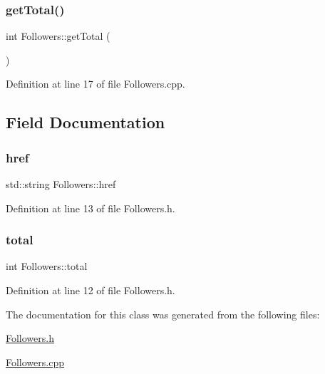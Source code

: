 \mbox{\label{class_followers_a2314b173d6733b64e4c92d19602bc0ff}} 
\subsubsection{\texorpdfstring{get\+Total()}{getTotal()}}
{\footnotesize\ttfamily int Followers\+::get\+Total (\begin{DoxyParamCaption}{ }\end{DoxyParamCaption})}



Definition at line 17 of file Followers.\+cpp.



\subsection{Field Documentation}
\mbox{\label{class_followers_a13192d1a6d176d29d8cc70d490b6b978}} 
\subsubsection{\texorpdfstring{href}{href}}
{\footnotesize\ttfamily std\+::string Followers\+::href\hspace{0.3cm}{\ttfamily [private]}}



Definition at line 13 of file Followers.\+h.

\mbox{\label{class_followers_ac4385632adc7b63b6fcaf77499dbcdbb}} 
\subsubsection{\texorpdfstring{total}{total}}
{\footnotesize\ttfamily int Followers\+::total\hspace{0.3cm}{\ttfamily [private]}}



Definition at line 12 of file Followers.\+h.



The documentation for this class was generated from the following files\+:\begin{DoxyCompactItemize}
\item 
\mbox{\hyperlink{_followers_8h}{Followers.\+h}}\item 
\mbox{\hyperlink{_followers_8cpp}{Followers.\+cpp}}\end{DoxyCompactItemize}
